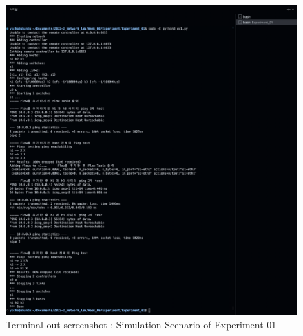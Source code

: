 \begin{figure}[!h]\centering 
	\includegraphics[width=.99\textwidth]{image/week06/1-2.png}
	\caption{
	Terminal out screenshot : Simulation Scenario of Experiment 01}
	\vspace{-10pt}
\end{figure}
\clearpage